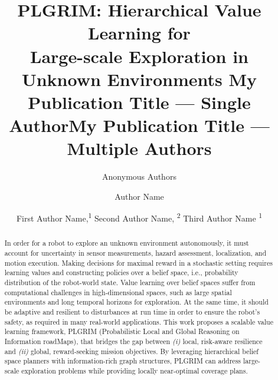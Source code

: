 \documentclass[letterpaper]{article} %
\title{
    PLGRIM: Hierarchical Value Learning for \\Large-scale Exploration in Unknown Environments
}
\author{
    Anonymous Authors \\  %
}
\title{My Publication Title --- Single Author}
\author {
    Author Name \\
}
\title{My Publication Title --- Multiple Authors}
\author {
    First Author Name,\textsuperscript{\rm 1}
    Second Author Name, \textsuperscript{\rm 2}
    Third Author Name \textsuperscript{\rm 1} \\
}
\newcommand{\gautam}[1]{{\color{cyan}Gautam: #1 }}
\begin{document}
\maketitle

\begin{abstract}
In order for a robot to explore an unknown environment autonomously, it must account for uncertainty in sensor measurements, hazard assessment, localization, and motion execution.
Making decisions for maximal reward in a stochastic setting requires learning values and constructing policies over a belief space, i.e., probability distribution of the robot-world state.
Value learning over belief spaces suffer from computational challenges in high-dimensional spaces, such as large spatial environments and long temporal horizons for exploration. %
At the same time, it should be adaptive and resilient to disturbances at run time in order to ensure the robot's safety, as required in many real-world applications.
This work proposes a scalable value learning framework, PLGRIM (Probabilistic Local and Global Reasoning on Information roadMaps), that bridges the gap between \textit{(i)} local, risk-aware resilience and \textit{(ii)} global, reward-seeking mission objectives.  
By leveraging hierarchical belief space planners with information-rich graph structures, PLGRIM can address large-scale exploration problems while providing locally near-optimal coverage plans. %

\end{abstract}
\end{document}
